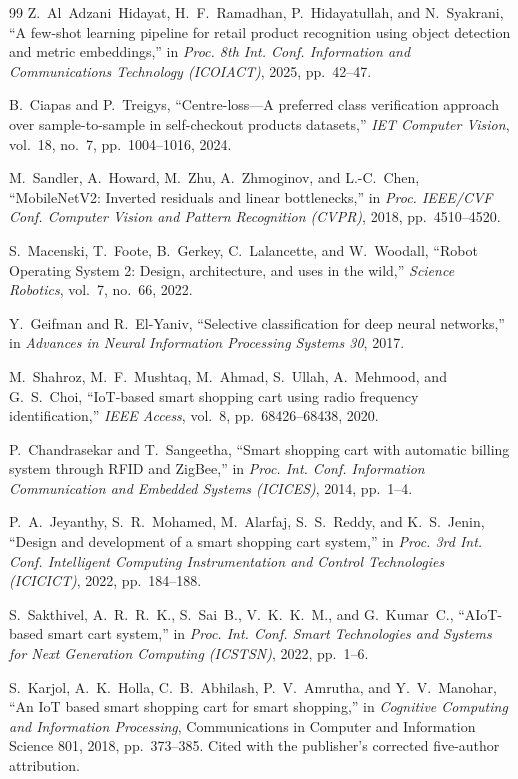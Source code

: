 \documentclass[conference]{IEEEtran}
\begin{document}
\begin{thebibliography}{99}
 Z.~Al~Adzani~Hidayat, H.~F.~Ramadhan, P.~Hidayatullah, and N.~Syakrani, ``A few-shot
learning pipeline for retail product recognition using object detection and metric embeddings,'' in
\emph{Proc. 8th Int. Conf. Information and Communications Technology (ICOIACT)}, 2025, pp.~42--47.

 B.~Ciapas and P.~Treigys, ``Centre-loss---A preferred class verification approach over
sample-to-sample in self-checkout products datasets,'' \emph{IET Computer Vision}, vol.~18, no.~7,
pp.~1004--1016, 2024.

 M.~Sandler, A.~Howard, M.~Zhu, A.~Zhmoginov, and L.-C.~Chen, ``MobileNetV2: Inverted
residuals and linear bottlenecks,'' in \emph{Proc. IEEE/CVF Conf. Computer Vision and Pattern
Recognition (CVPR)}, 2018, pp.~4510--4520.

 S.~Macenski, T.~Foote, B.~Gerkey, C.~Lalancette, and W.~Woodall, ``Robot Operating
System 2: Design, architecture, and uses in the wild,'' \emph{Science Robotics}, vol.~7, no.~66, 2022.

 Y.~Geifman and R.~El-Yaniv, ``Selective classification for deep neural networks,'' in
\emph{Advances in Neural Information Processing Systems 30}, 2017.

 M.~Shahroz, M.~F.~Mushtaq, M.~Ahmad, S.~Ullah, A.~Mehmood, and G.~S.~Choi, ``IoT-based
smart shopping cart using radio frequency identification,'' \emph{IEEE Access}, vol.~8,
pp.~68426--68438, 2020.

 P.~Chandrasekar and T.~Sangeetha, ``Smart shopping cart with automatic billing system
through RFID and ZigBee,'' in \emph{Proc. Int. Conf. Information Communication and Embedded Systems
(ICICES)}, 2014, pp.~1--4.

 P.~A.~Jeyanthy, S.~R.~Mohamed, M.~Alarfaj, S.~S.~Reddy, and K.~S.~Jenin, ``Design and
development of a smart shopping cart system,'' in \emph{Proc. 3rd Int. Conf. Intelligent Computing
Instrumentation and Control Technologies (ICICICT)}, 2022, pp.~184--188.

 S.~Sakthivel, A.~R.~R.~K., S.~Sai~B., V.~K.~K.~M., and G.~Kumar~C., ``AIoT-based smart
cart system,'' in \emph{Proc. Int. Conf. Smart Technologies and Systems for Next Generation Computing
(ICSTSN)}, 2022, pp.~1--6.

 S.~Karjol, A.~K.~Holla, C.~B.~Abhilash, P.~V.~Amrutha, and Y.~V.~Manohar, ``An IoT based
smart shopping cart for smart shopping,'' in \emph{Cognitive Computing and Information Processing},
Communications in Computer and Information Science 801, 2018, pp.~373--385. Cited with the publisher's
corrected five-author attribution.


\end{thebibliography}
\end{document}
